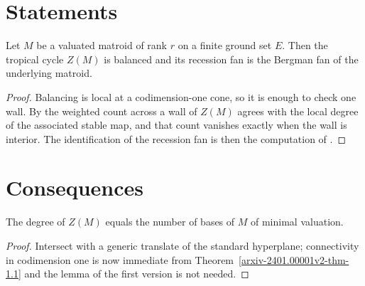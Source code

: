 
\section{Statements}\label{arxiv-2401.00001v2-sec-1}

\begin{theorem}\label{arxiv-2401.00001v2-thm-1.1}
\label{arxiv-2401.00001v2-thm:main}
Let $M$ be a valuated matroid of rank $r$ on a finite ground set $E$. Then the tropical cycle $Z(M)$ is balanced and its recession fan is the Bergman fan of the underlying matroid.
\end{theorem}

\begin{proof}
Balancing is local at a codimension-one cone, so it is enough to check one wall. By \cite[Theorem 1.1]{other} the weighted count across a wall of $Z(M)$ agrees with the local degree of the associated stable map, and that count vanishes exactly when the wall is interior. The identification of the recession fan is then the computation of \cite{third}.
\end{proof}

\section{Consequences}\label{arxiv-2401.00001v2-sec-2}

\begin{proposition}\label{arxiv-2401.00001v2-prop-2.1}
\label{arxiv-2401.00001v2-prop:degree}
The degree of $Z(M)$ equals the number of bases of $M$ of minimal valuation.
\end{proposition}

\begin{proof}
Intersect with a generic translate of the standard hyperplane; connectivity in codimension one is now immediate from Theorem~\ref{arxiv-2401.00001v2-thm-1.1} and the lemma of the first version is not needed.
\end{proof}
